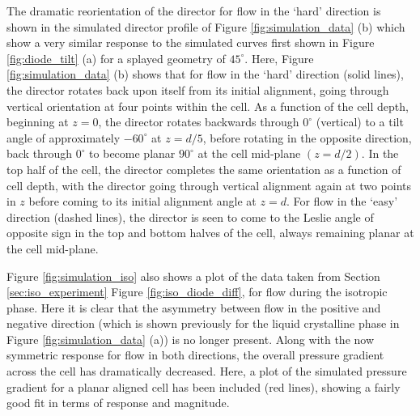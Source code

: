 The dramatic reorientation of the director for flow in the `hard' direction is shown in the simulated director profile of Figure \ref{fig:simulation_data} (b) which show a very similar response to the simulated curves first shown in Figure \ref{fig:diode_tilt} (a) for a splayed geometry of $45^{\circ}$. Here, Figure \ref{fig:simulation_data} (b) shows that for flow in the `hard' direction (solid lines), the director rotates back upon itself from its initial alignment, going through vertical orientation at four points within the cell. As a function of the cell depth, beginning at $z=0$, the director rotates backwards through $0^{\circ}$ (vertical) to a tilt angle of approximately $-60^{\circ}$ at $z=d/5$, before rotating in the opposite direction, back through $0^{\circ}$ to become planar $90^{\circ}$ at the cell mid-plane $\left(z=d/2\right)$. In the top half of the cell, the director completes the same orientation as a function of cell depth, with the director going through vertical alignment again at two points in $z$ before coming to its initial alignment angle at $z=d$. For flow in the `easy' direction (dashed lines), the director is seen to come to the Leslie angle of opposite sign in the top and bottom halves of the cell, always remaining planar at the cell mid-plane.

Figure \ref{fig:simulation_iso} also shows a plot of the data taken from Section \ref{sec:iso_experiment} Figure \ref{fig:iso_diode_diff}, for flow during the isotropic phase. Here it is clear that the asymmetry between flow in the positive and negative direction (which is shown previously for the liquid crystalline phase in Figure \ref{fig:simulation_data} (a)) is no longer present. Along with the now symmetric response for flow in both directions, the overall pressure gradient across the cell has dramatically decreased. Here, a plot of the simulated pressure gradient for a planar aligned cell has been included (red lines), showing a fairly good fit in terms of response and magnitude.

